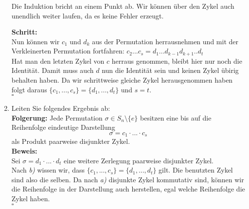 \documentclass[11pt,a4paper,ngerman]{article}
\begin{document}
\begin{enumerate}[\bfseries a)]

Die Induktion bricht an einem Punkt ab. Wir können über den Zykel auch unendlich weiter laufen, da es keine Fehler erzeugt.

\textbf{Schritt:}\\
Nun können wir $c_1$ und $d_k$ aus der Permutation herrausnehmen und mit der Verkleinerten Permutation fortfahren:
$c_2 ... c_s = d_1 ... d_{k-1} d_{k+1} .. d_t$\\

Hat man den letzten Zykel von $c$ herraus genommen, bleibt hier nur noch die Identität. Damit muss auch $d$ nun die Identität sein und keinen Zykel übirig behalten haben. Da wir schrittweise gleiche Zykel herausgenommen haben folgt daraus $\{ c_1 , ... , c_s \} = \{ d_1 , ... , d_t \}$ und $s = t$. \\
\mbox{} \hfill $\square$

\item Leiten Sie folgendes Ergebnis ab: \\
\textbf{Folgerung:} Jede Permutation $\sigma \in S_n \setminus \{ e \}$ besitzen eine bis auf die Reihenfolge eindeutige Darstellung
$$
\sigma = c_1 \cdot ... \cdot c_s
$$
als Produkt paarweise disjunkter Zykel.\\

\textbf{Beweis:}\\
Sei $\sigma = d_1 \cdot ... \cdot d_t$ eine weitere Zerlegung paarweise disjunkter Zykel.\\

Nach \emph{b)} wissen wir, dass $\{c_1 , ..., c_s \} = \{ d_1 , ... , d_t \}$ gilt. Die benutzten Zykel sind also die selben. Da nach \emph{a)} disjunkte Zykel kommutativ sind, können wir die Reihenfolge in der Darstellung auch herstellen, egal welche Reihenfolge die Zykel haben.\\
\mbox{} \hfill $\square$

\end{enumerate}
\end{document}
